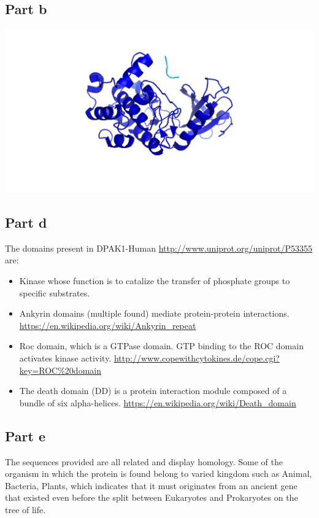 \documentclass[11pt, a4paper,titlepage]{article}
\begin{document}
\subsection{Part b}
\includegraphics[width=15cm]{./Figures/5c.png}

\subsection{Part d}
The domains present in DPAK1-Human
\url{http://www.uniprot.org/uniprot/P53355} are:

\begin{itemize}
\item Kinase whose function is to catalize the transfer of phosphate
  groups to specific substrates.
\item Ankyrin domains (multiple found) mediate protein-protein
  interactions.
  \url{https://en.wikipedia.org/wiki/Ankyrin_repeat}
\item Roc domain, which is a GTPase domain. GTP binding to the ROC
  domain activates kinase activity.
  \url{http://www.copewithcytokines.de/cope.cgi?key=ROC%20domain} 
\item The death domain (DD) is a protein interaction module composed
  of a bundle of six alpha-helices.
  \url{https://en.wikipedia.org/wiki/Death_domain}
\end{itemize}
\subsection{Part e}

The sequences provided are all related and display homology. Some of
the organism in which the protein is found belong to varied kingdom
such as Animal, Bacteria, Plants, which indicates that it must
originates from an ancient gene that existed even before the split
between Eukaryotes and Prokaryotes on the tree of life.
\end{document}
